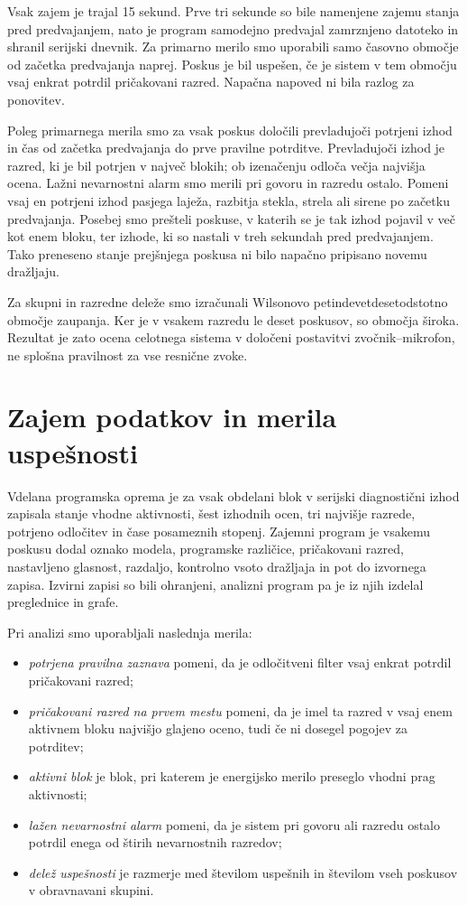 Vsak zajem je trajal 15 sekund. Prve tri sekunde so bile namenjene zajemu
stanja pred predvajanjem, nato je program samodejno predvajal zamrznjeno
datoteko in shranil serijski dnevnik. Za primarno merilo smo uporabili samo
časovno območje od začetka predvajanja naprej. Poskus je bil uspešen, če je
sistem v tem območju vsaj enkrat potrdil pričakovani razred. Napačna napoved ni
bila razlog za ponovitev.

Poleg primarnega merila smo za vsak poskus določili prevladujoči potrjeni izhod
in čas od začetka predvajanja do prve pravilne potrditve. Prevladujoči izhod je
razred, ki je bil potrjen v največ blokih; ob izenačenju odloča večja najvišja
ocena.
Lažni nevarnostni alarm smo merili pri govoru in razredu ostalo. Pomeni vsaj en
potrjeni izhod pasjega laježa, razbitja stekla, strela ali sirene po začetku
predvajanja. Posebej smo prešteli poskuse, v katerih se je tak izhod pojavil v
več kot enem bloku, ter izhode, ki so nastali v treh sekundah pred
predvajanjem. Tako preneseno stanje prejšnjega poskusa ni bilo napačno
pripisano novemu dražljaju.

Za skupni in razredne deleže smo izračunali Wilsonovo
petindevetdesetodstotno območje zaupanja. Ker je v vsakem razredu le deset
poskusov, so območja široka. Rezultat je zato ocena celotnega sistema v
določeni postavitvi zvočnik--mikrofon, ne splošna pravilnost za vse resnične
zvoke.

\section{Zajem podatkov in merila uspešnosti}

Vdelana programska oprema je za vsak obdelani blok v serijski diagnostični
izhod zapisala stanje vhodne aktivnosti, šest izhodnih ocen, tri najvišje
razrede, potrjeno odločitev in čase posameznih stopenj. Zajemni program je
vsakemu poskusu dodal oznako modela, programske različice, pričakovani razred,
nastavljeno glasnost, razdaljo, kontrolno vsoto dražljaja in pot do izvornega
zapisa. Izvirni zapisi so bili ohranjeni, analizni program pa je iz njih izdelal
preglednice in grafe.

Pri analizi smo uporabljali naslednja merila:

\begin{itemize}
  \item \emph{potrjena pravilna zaznava} pomeni, da je odločitveni filter vsaj
        enkrat potrdil pričakovani razred;
  \item \emph{pričakovani razred na prvem mestu} pomeni, da je imel ta razred
        v vsaj enem aktivnem bloku najvišjo glajeno oceno, tudi če ni dosegel
        pogojev za potrditev;
  \item \emph{aktivni blok} je blok, pri katerem je energijsko merilo preseglo
        vhodni prag aktivnosti;
  \item \emph{lažen nevarnostni alarm} pomeni, da je sistem pri govoru ali
        razredu ostalo potrdil enega od štirih nevarnostnih razredov;
  \item \emph{delež uspešnosti} je razmerje med številom uspešnih in številom
        vseh poskusov v obravnavani skupini.
\end{itemize}

